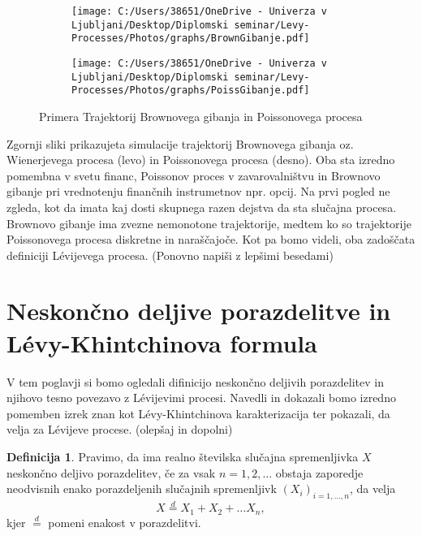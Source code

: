 \documentclass[12pt,a4paper]{amsart}
\theoremstyle{definition} %
\newtheorem{definicija}{Definicija}[section]
\theoremstyle{plain} %
\begin{document}
    \begin{figure}[H]
        \centering
        \begin{subfigure}{0.5\textwidth}
            \centering
            \texttt{[image: C:/Users/38651/OneDrive - Univerza v Ljubljani/Desktop/Diplomski seminar/Levy-Processes/Photos/graphs/BrownGibanje.pdf]}
        \end{subfigure}%
        \begin{subfigure}{0.5\textwidth}
            \centering
            \texttt{[image: C:/Users/38651/OneDrive - Univerza v Ljubljani/Desktop/Diplomski seminar/Levy-Processes/Photos/graphs/PoissGibanje.pdf]}
        \end{subfigure}
        \caption{Primera Trajektorij Brownovega gibanja in Poissonovega procesa}
        \label{slika1}
    \end{figure}
       
    \noindent
    Zgornji sliki prikazujeta simulacije trajektorij Brownovega gibanja oz. Wienerjevega procesa (levo) in 
    Poissonovega procesa (desno). Oba sta izredno pomembna v svetu financ, Poissonov proces v zavarovalništvu in Brownovo
    gibanje pri vrednotenju finančnih instrumetnov npr. opcij. Na prvi pogled ne zgleda, kot da imata kaj dosti skupnega
    razen dejstva da sta slučajna procesa. Brownovo gibanje ima zvezne nemonotone trajektorije, medtem ko so trajektorije 
    Poissonovega procesa diskretne in naraščajoče. Kot pa bomo videli, oba zadoščata definiciji Lévijevega procesa. (Ponovno napiši z lepšimi besedami)



\section{Neskončno deljive porazdelitve in Lévy-Khintchinova formula}
    V tem poglavji si bomo ogledali difinicijo neskončno deljivih porazdelitev in njihovo tesno povezavo
    z Lévijevimi procesi. Navedli in dokazali bomo izredno pomemben izrek znan kot Lévy-Khintchinova karakterizacija
    ter pokazali, da velja za Lévijeve procese. (olepšaj in dopolni)
    
    
    \begin{definicija}
        Pravimo, da ima realno številska slučajna spremenljivka $X$ neskončno deljivo porazdelitev, če
        za vsak $n=1,2,\dots$ obstaja zaporedje neodvisnih enako porazdeljenih slučajnih spremenljivk $(X_i)_{i=1,\dots,n}$, 
        da velja 
        $$
        X \stackrel{d}{=} X_1 + X_2 + \dots X_n,
        $$
        kjer $\stackrel{d}{=}$ pomeni enakost v porazdelitvi.
    \end{definicija}
\end{document}
